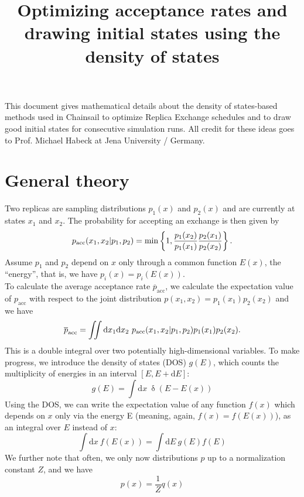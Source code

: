 \documentclass{article}
\title{Optimizing acceptance rates and drawing initial states using the density of states}
\date{}
\renewcommand{\d}{\mathrm{d}}
\begin{document}
\maketitle
This document gives mathematical details about the density of states-based methods used in Chainsail to optimize Replica Exchange schedules and to draw good initial states for consecutive simulation runs. All credit for these ideas goes to Prof. Michael Habeck at Jena University / Germany.
\section*{General theory}
Two replicas are sampling distributions $p_1(x)$ and $p_2(x)$ and are currently at states $x_1$ and $x_2$. The probability for accepting an exchange is then given by
\begin{equation}
  p_{\mathrm{acc}}(x_1, x_2|p_1, p_2) = \mathrm{min}\left\{1, \frac{p_1(x_2)}{p_1(x_1)} \frac{p_2(x_1)}{p_2(x_2)}\right\} \mbox .
\end{equation}
Assume $p_1$ and $p_2$ depend on $x$ only through a common function $E(x)$, the ``energy'', that is, we have $p_i(x)=p_i(E(x))$. \\
To calculate the average acceptance rate $\overline{p}_{\mathrm{acc}}$, we calculate the expectation value of $p_{\mathrm{acc}}$ with respect to the joint distribution $p(x_1, x_2)=p_1(x_1)p_2(x_2)$ and we have
\begin{equation}
  \overline{p}_{\mathrm{acc}} = \iint \d x_1 \d x_2 \ p_{\mathrm{acc}}(x_1, x_2|p_1, p_2) p_1(x_1)p_2(x_2) \mbox .
\end{equation}
This is a double integral over two potentially high-dimensional variables. To make progress, we introduce the density of states (DOS) $g(E)$, which counts the multiplicity of energies in an interval $[E, E + \d E]$:
\begin{equation*}
  g(E) = \int \d x \ \updelta(E-E(x))
\end{equation*}
Using the DOS, we can write the expectation value of any function $f(x)$ which depends on $x$ only via the energy E (meaning, again, $f(x)=f(E(x))$), as an integral over $E$ instead of $x$:
\begin{equation*}
  \int \d x \ f(E(x)) = \int \d E \ g(E) f(E)
\end{equation*}
We further note that often, we only now distributions $p$ up to a normalization constant $Z$, and we have
\begin{equation*}
  p(x) = \frac{1}{Z}q(x)
\end{equation*}
\end{document}

